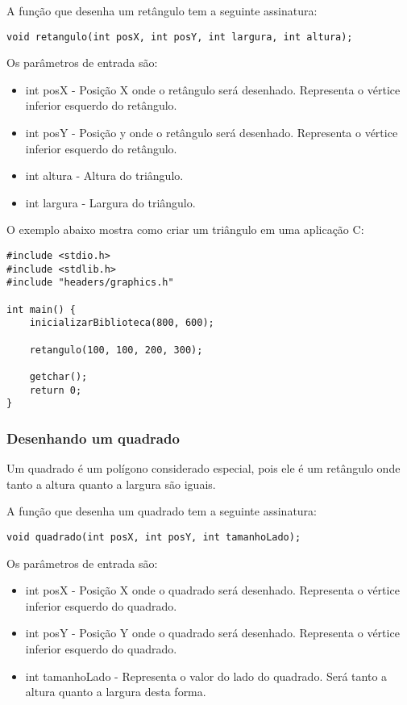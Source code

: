 \documentclass[12pt, %
openright,
oneside, %
a4paper,    %
brazil]{facom-ufu-abntex2}
\begin{document}
A função que desenha um retângulo tem a seguinte assinatura:

\begin{lstlisting}
void retangulo(int posX, int posY, int largura, int altura);
\end{lstlisting}

Os parâmetros de entrada são:

\begin{itemize}
    \item int posX - Posição X onde o retângulo será desenhado. Representa o vértice inferior esquerdo do retângulo.
    \item int posY - Posição y onde o retângulo será desenhado. Representa o vértice inferior esquerdo do retângulo.
    \item int altura - Altura do triângulo.
    \item int largura - Largura do triângulo.
\end{itemize}

O exemplo abaixo mostra como criar um triângulo em uma aplicação C:

\begin{lstlisting}
#include <stdio.h>
#include <stdlib.h>
#include "headers/graphics.h"

int main() {
    inicializarBiblioteca(800, 600);

    retangulo(100, 100, 200, 300);

    getchar();
    return 0;
}
\end{lstlisting}

\subsubsection{Desenhando um quadrado}
Um quadrado é um polígono considerado especial, pois ele é um retângulo onde tanto a altura quanto a largura são iguais.

A função que desenha um quadrado tem a seguinte assinatura:

\begin{lstlisting}
void quadrado(int posX, int posY, int tamanhoLado);
\end{lstlisting}

Os parâmetros de entrada são:

\begin{itemize}
    \item int posX - Posição X onde o quadrado será desenhado. Representa o vértice inferior esquerdo do quadrado.
    \item int posY - Posição Y onde o quadrado será desenhado. Representa o vértice inferior esquerdo do quadrado.
    \item int tamanhoLado - Representa o valor do lado do quadrado. Será tanto a altura quanto a largura desta forma.
\end{itemize}
\end{document}

